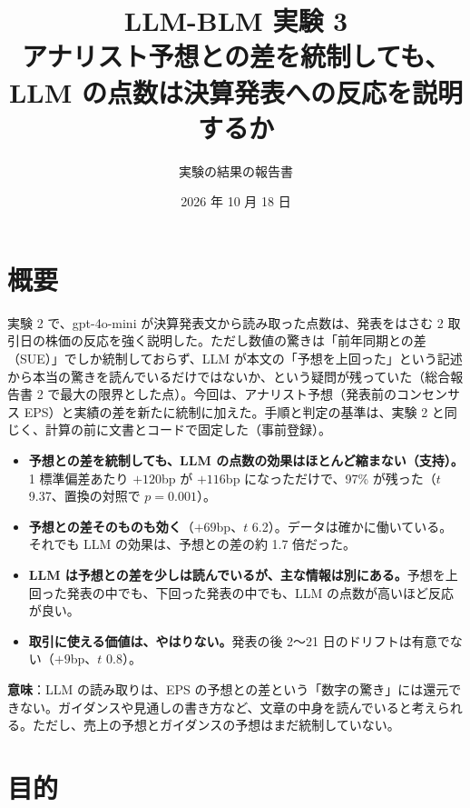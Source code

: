 \documentclass[xelatex,ja=standard,jafont=haranoaji,a4paper,10pt,openany]{bxjsreport}
\title{LLM-BLM 実験 3\\[6pt]
  \large アナリスト予想との差を統制しても、\\LLM の点数は決算発表への反応を説明するか}
\author{実験の結果の報告書}
\date{2026 年 10 月 18 日}
\begin{document}
\maketitle

\chapter*{概要}

実験 2 で、gpt-4o-mini が決算発表文から読み取った点数は、発表をはさむ 2 取引日の株価の反応を強く説明した。ただし数値の驚きは「前年同期との差（SUE）」でしか統制しておらず、LLM が本文の「予想を上回った」という記述から本当の驚きを読んでいるだけではないか、という疑問が残っていた（総合報告書 2 で最大の限界とした点）。今回は、アナリスト予想（発表前のコンセンサス EPS）と実績の差を新たに統制に加えた。手順と判定の基準は、実験 2 と同じく、計算の前に文書とコードで固定した（事前登録）。

\begin{keybox}[主な結論]
\begin{itemize}
\item \textbf{予想との差を統制しても、LLM の点数の効果はほとんど縮まない（支持）。}1 標準偏差あたり $+120$bp が $+116$bp になっただけで、97\% が残った（$t$ 9.37、置換の対照で $p=0.001$）。
\item \textbf{予想との差そのものも効く}（$+69$bp、$t$ 6.2）。データは確かに働いている。それでも LLM の効果は、予想との差の約 1.7 倍だった。
\item \textbf{LLM は予想との差を少しは読んでいるが、主な情報は別にある。}予想を上回った発表の中でも、下回った発表の中でも、LLM の点数が高いほど反応が良い。
\item \textbf{取引に使える価値は、やはりない。}発表の後 2〜21 日のドリフトは有意でない（$+9$bp、$t$ 0.8）。
\end{itemize}
\end{keybox}

\textbf{意味}：LLM の読み取りは、EPS の予想との差という「数字の驚き」には還元できない。ガイダンスや見通しの書き方など、文章の中身を読んでいると考えられる。ただし、売上の予想とガイダンスの予想はまだ統制していない。

\setcounter{tocdepth}{1}
{\small\tableofcontents}

\chapter{目的}\label{ch:intro}
\end{document}
